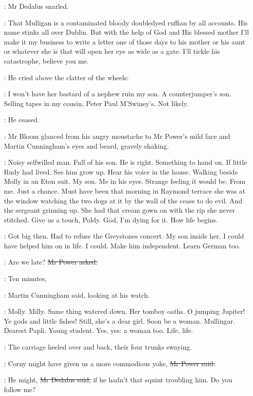 :
Mr Dedalus snarled.

\simon:
That Mulligan is a contaminated bloody doubledyed ruffian by all accounts.
His name stinks all over Dublin.
But with the help of God and His blessed mother
I'll make it my business to write a letter
one of those days
to his mother or his aunt or whatever she is
that will open her eye as wide as a gate.
I'll tickle his catastrophe, believe you me.

:
He cried above the clatter of the wheels:

\simon:
I won't have her bastard of a nephew ruin my son.
A counterjumper's son.
Selling tapes in my cousin, Peter Paul M'Swiney's.
Not likely.

:
He ceased.

:
Mr Bloom glanced from his angry moustache
to Mr Power's mild face
and Martin Cunningham's eyes and beard,
gravely shaking.

\BloomInt:
Noisy selfwilled man.
Full of his son.
He is right.
Something to hand on.
If little Rudy had lived.
See him grow up.
Hear his voice in the house.
Walking beside Molly in an Eton suit.
My son.
Me in his eyes.
Strange feeling it would be.
From me.
Just a chance.
Must have been that morning in Raymond terrace
she was at the window watching the two dogs at it
by the wall of the cease to do evil.
And the sergeant grinning up.
She had that cream gown on with the rip she never stitched.
Give us a touch, Poldy.
God, I'm dying for it.
How life begins.

\BloomInt:
Got big then.
Had to refuse the Greystones concert.
My son inside her.
I could have helped him on in life.
I could.
Make him independent.
Learn German too.

\power:
Are we late?
\sout{Mr Power asked.}

\cunningham:
Ten minutes,

:
Martin Cunningham said, looking at his watch.

\BloomInt:
Molly.
Milly.
Same thing watered down.
Her tomboy oaths.
O jumping Jupiter!
Ye gods and little fishes!
Still, she's a dear girl.
Soon be a woman.
Mullingar.
Dearest Papli.
Young student.
Yes, yes:
a woman too.
Life,
life.

:
The carriage heeled over and back,
their four trunks swaying.

\power:
Corny might have given us a more commodious yoke,
\sout{Mr Power said.}

\simon:
He might,
\sout{Mr Dedalus said,}
if he hadn't that squint troubling him.
Do you follow me?

